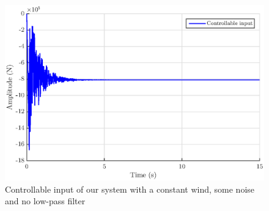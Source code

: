 \begin{figure}[H]
    \centering
    \includegraphics[scale = 0.7]{resources/eps/noise_nolpf.eps}
    \caption{Controllable input of our system with a constant wind, some noise and no low-pass filter}
    \label{fig:noisenolpf}
\end{figure}

